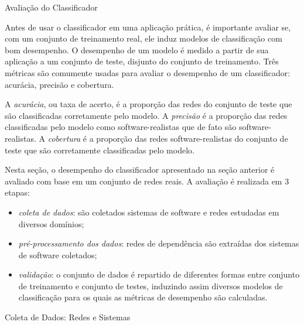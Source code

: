 \begin{section}{Avaliação do Classificador} \label{cap:clas3}

	Antes de usar o classificador em uma aplicação prática, é importante avaliar se, com um conjunto de treinamento real, ele induz modelos de classificação com bom desempenho. O desempenho de um modelo é medido a partir de sua aplicação a um conjunto de teste, disjunto do conjunto de treinamento. Três métricas são comumente usadas para avaliar o desempenho de um classificador: acurácia, precisão e cobertura.

	A \emph{acurácia}, ou taxa de acerto, é a proporção das redes do conjunto de teste que são classificadas corretamente pelo modelo. A \emph{precisão} é a proporção das redes classificadas pelo modelo como software-realistas que de fato são software-realistas. A \emph{cobertura} é a proporção das redes software-realistas do conjunto de teste que são corretamente classificadas pelo modelo.
	
	Nesta seção, o desempenho do classificador apresentado na seção anterior é avaliado com base em um conjunto de redes reais. A avaliação é realizada em 3 etapas: 
	
	\begin{itemize}
		\item \emph{coleta de dados}: são coletados sistemas de software e redes estudadas em diversos domínios;
		\item \emph{pré-processamento dos dados}: redes de dependência são extraídas dos sistemas de software coletados;
		\item \emph{validação}: o conjunto de dados é repartido de diferentes formas entre conjunto de treinamento e conjunto de testes, induzindo assim diversos modelos de classificação para os quais as métricas de desempenho são calculadas. %
	\end{itemize}
	
	
\begin{subsection}{Coleta de Dados: Redes e Sistemas}


\end{subsection}
\end{section}
